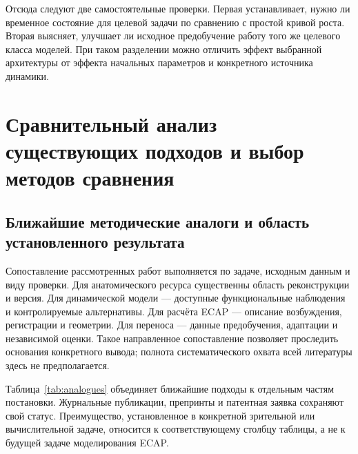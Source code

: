 Отсюда следуют две самостоятельные проверки. Первая устанавливает, нужно ли временное состояние для целевой задачи по сравнению с простой кривой роста. Вторая выясняет, улучшает ли исходное предобучение работу того же целевого класса моделей. При таком разделении можно отличить эффект выбранной архитектуры от эффекта начальных параметров и конкретного источника динамики.

\section{Сравнительный анализ существующих подходов и выбор методов сравнения}
\label{sec:comparisons}

\subsection{Ближайшие методические аналоги и область установленного результата}

Сопоставление рассмотренных работ выполняется по задаче, исходным данным и виду проверки. Для анатомического ресурса существенны область реконструкции и версия. Для динамической модели --- доступные функциональные наблюдения и контролируемые альтернативы. Для расчёта ECAP --- описание возбуждения, регистрации и геометрии. Для переноса --- данные предобучения, адаптации и независимой оценки. Такое направленное сопоставление позволяет проследить основания конкретного вывода; полнота систематического охвата всей литературы здесь не предполагается.

Таблица~\ref{tab:analogues} объединяет ближайшие подходы к отдельным частям постановки. Журнальные публикации, препринты и патентная заявка сохраняют свой статус. Преимущество, установленное в конкретной зрительной или вычислительной задаче, относится к соответствующему столбцу таблицы, а не к будущей задаче моделирования ECAP.

